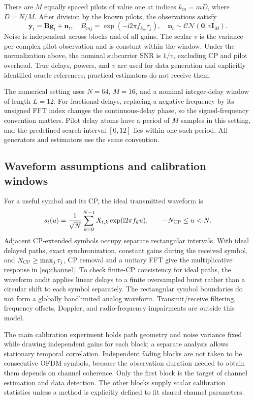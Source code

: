 There are $M$ equally spaced pilots of value one at indices $k_m=mD$, where
$D=N/M$. After division by the known pilots, the observations satisfy
\begin{equation}
 \mathbf y_t=\mathbf B\mathbf g_t+\mathbf n_t,
 \quad B_{mj}=\exp(-\mathrm{i}2\pi f_{k_m}\tau_j),
 \quad \mathbf n_t\sim\mathcal{CN}(\mathbf0,v\mathbf I_M).
 \label{eq:pilotmodel}
\end{equation}
Noise is independent across blocks and of all gains. The scalar
$v$ is the variance per complex pilot observation and is constant within the
window. Under the normalization above, the nominal subcarrier SNR is $1/v$,
excluding CP and pilot overhead. True delays, powers, and $v$ are used for data
generation and explicitly identified oracle references; practical estimators
do not receive them.

The numerical setting uses $N=64$, $M=16$, and a nominal integer-delay window
of length $L=12$. For fractional delays, replacing a negative frequency by its
unsigned FFT index changes the continuous-delay phase, so the signed-frequency
convention matters. Pilot delay atoms have a period of $M$ samples in this
setting, and the predefined search interval $[0,12]$ lies within one such
period. All generators and estimators use the same convention.

\subsection{Waveform assumptions and calibration windows}
For a useful symbol and its CP, the ideal transmitted waveform is
\begin{equation}
 s_t(u)=\frac{1}{\sqrt N}\sum_{k=0}^{N-1}X_{t,k}
             \exp(\mathrm{i}2\pi f_ku),
 \qquad -N_{\rm CP}\leq u<N.
 \label{eq:waveform}
\end{equation}
Adjacent CP-extended symbols occupy separate rectangular intervals. With ideal
delayed paths, exact synchronization, constant gains during the received
symbol, and $N_{\rm CP}\geq\max_j\tau_j$, CP removal and a unitary FFT give
the multiplicative response in \eqref{eq:channel}. To check finite-CP
consistency for ideal paths, the waveform audit applies linear delays to a
finite oversampled burst rather than a circular shift to each symbol
separately. The rectangular symbol boundaries do not form a globally bandlimited
analog waveform. Transmit/receive filtering, frequency offsets, Doppler, and
radio-frequency impairments are outside this model.

The main calibration experiment holds path geometry and noise variance fixed
while drawing independent gains for each block; a separate analysis allows
stationary temporal correlation. Independent fading blocks are not taken to be
consecutive OFDM symbols, because the observation duration needed to obtain
them depends on channel coherence. Only the first block is the target of
channel estimation and data detection. The other
blocks supply scalar calibration statistics unless a method is explicitly
defined to fit shared channel parameters.


